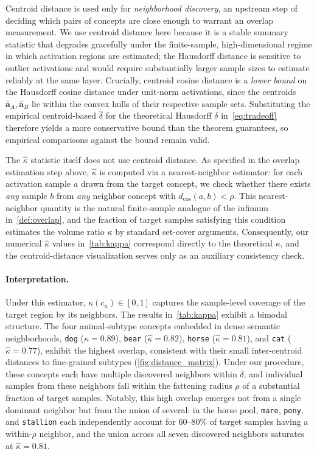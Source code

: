 Centroid distance is used only for \emph{neighborhood discovery}, an upstream step of deciding which pairs of concepts are close enough to warrant an overlap measurement. We use centroid distance here because it is a stable summary statistic that degrades gracefully under the finite-sample, high-dimensional regime in which activation regions are estimated; the Hausdorff distance is sensitive to outlier activations and would require substantially larger sample sizes to estimate reliably at the same layer. Crucially, centroid cosine distance is a \emph{lower bound} on the Hausdorff cosine distance under unit-norm activations, since the centroids $\bar{\mathbf{a}}_A, \bar{\mathbf{a}}_B$ lie within the convex hulls of their respective sample sets. Substituting the empirical centroid-based $\hat\delta$ for the theoretical Hausdorff $\delta$ in~\cref{eq:tradeoff} therefore yields a more conservative bound than the theorem guarantees, so empirical comparisons against the bound remain valid.

The $\hat\kappa$ statistic itself does not use centroid distance. As specified in the overlap estimation step above, $\hat\kappa$ is computed via a nearest-neighbor estimator: for each activation sample $a$ drawn from the target concept, we check whether there exists \emph{any} sample $b$ from \emph{any} neighbor concept with $d_{\cos}(a, b) < \rho$. This nearest-neighbor quantity is the natural finite-sample analogue of the infimum in~\cref{def:overlap}, and the fraction of target samples satisfying this condition estimates the volume ratio $\kappa$ by standard set-cover arguments. Consequently, our numerical $\hat\kappa$ values in~\cref{tab:kappa} correspond directly to the theoretical $\kappa$, and the centroid-distance visualization serves only as an auxiliary consistency check.

\paragraph{Interpretation.}
Under this estimator, $\hat\kappa(c_u) \in [0, 1]$ captures the sample-level  coverage of the target region by its neighbors. The results in~\cref{tab:kappa} exhibit a bimodal structure. The four animal-subtype concepts embedded in dense semantic neighborhoods, \texttt{dog} ($\hat\kappa = 0.89$), \texttt{bear} ($\hat\kappa = 0.82$), \texttt{horse} ($\hat\kappa = 0.81$), and \texttt{cat} ($\hat\kappa = 0.77$), exhibit the  highest overlap, consistent with their small inter-centroid distances to fine-grained subtypes (\cref{fig:distance_matrix}). 
Under our procedure, these concepts each have multiple discovered neighbors within $\delta$, and individual samples from these neighbors fall within the fattening radius $\rho$ of a substantial fraction of target samples. Notably, this high overlap emerges not from a single dominant neighbor but from the union of several: in the horse pool, \texttt{mare}, \texttt{pony}, and \texttt{stallion} each independently account for 60--80\% of target samples having a within-$\rho$ neighbor, and the union across all seven discovered neighbors saturates at $\hat\kappa = 0.81$.

